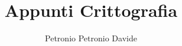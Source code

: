 \documentclass[12pt,a4paper,openany,oneside]{book}
\begin{document}


\title{Appunti Crittografia}
\author{Petronio Petronio Davide}


\tableofcontents








\newpage
{}

\end{document}
